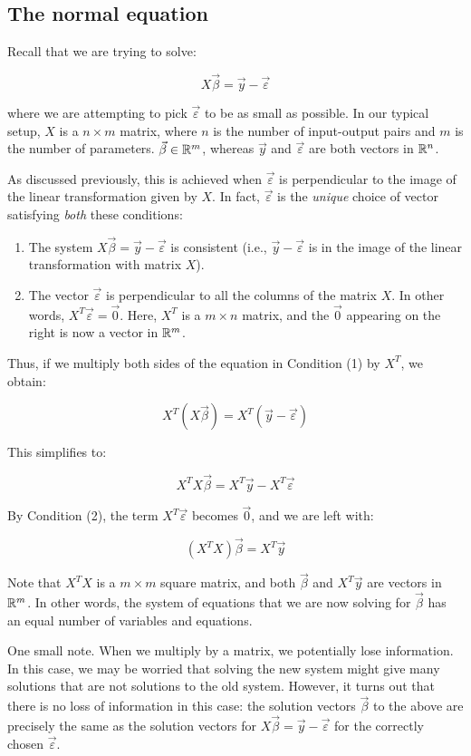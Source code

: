 \documentclass[10pt]{amsart}
\begin{document}
\subsection{The normal equation}

Recall that we are trying to solve:

$$X\vec{\beta} = \vec{y} - \vec{\varepsilon}$$

where we are attempting to pick $\vec{\varepsilon}$ to be as small as
possible. In our typical setup, $X$ is a $n \times m$ matrix, where
$n$ is the number of input-output pairs and $m$ is the number of
parameters. $\vec{\beta} \in \mathbb{R}^m$, whereas $\vec{y}$ and
$\vec{\varepsilon}$ are both vectors in $\mathbb{R}^n$.

As discussed previously, this is achieved when
$\vec{\varepsilon}$ is perpendicular to the image of the linear
transformation given by $X$. In fact, $\vec{\varepsilon}$ is the {\em
  unique} choice of vector satisfying {\em both} these conditions:

\begin{enumerate}
\item The system $X\vec{\beta} = \vec{y} - \vec{\varepsilon}$ is
  consistent (i.e., $\vec{y} - \vec{\varepsilon}$ is in the image of
  the linear transformation with matrix $X$).
\item The vector $\vec{\varepsilon}$ is perpendicular to all the columns of
  the matrix $X$. In other words, $X^T\vec{\varepsilon} =
  \vec{0}$. Here, $X^T$ is a $m \times n$ matrix, and the $\vec{0}$
  appearing on the right is now a vector in $\mathbb{R}^m$.
\end{enumerate}

Thus, if we multiply both sides of the equation in Condition
(1) by $X^T$, we obtain:

$$X^T(X\vec{\beta}) = X^T(\vec{y} - \vec{\varepsilon})$$

This simplifies to:

$$X^TX\vec{\beta} = X^T\vec{y} - X^T\vec{\varepsilon}$$

By Condition (2), the term $X^T\vec{\varepsilon}$ becomes $\vec{0}$, and we are left with:

$$(X^TX)\vec{\beta} = X^T\vec{y}$$

Note that $X^TX$ is a $m \times m$ square matrix, and both
$\vec{\beta}$ and $X^T\vec{y}$ are vectors in $\mathbb{R}^m$. In other words,
the system of equations that we are now solving for $\vec{\beta}$ has
an equal number of variables and equations.

One small note. When we multiply by a matrix, we potentially lose
information. In this case, we may be worried that solving the new
system might give many solutions that are not solutions to the old
system. However, it turns out that there is no loss of information in
this case: the solution vectors $\vec{\beta}$ to the above are
precisely the same as the solution vectors for $X\vec{\beta} = \vec{y}
- \vec{\varepsilon}$ for the correctly chosen $\vec{\varepsilon}$.
\end{document}
